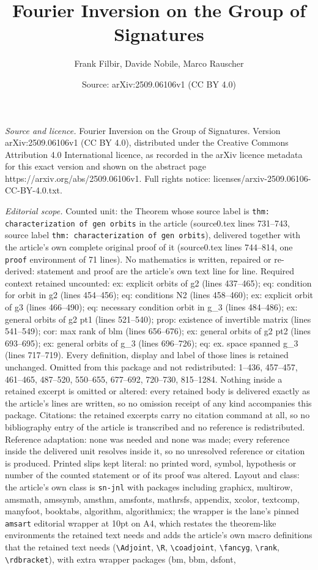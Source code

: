 \documentclass[10pt,a4paper]{amsart}
\title[Fourier Inversion on the Group of Signatures]{Fourier Inversion on the Group of Signatures}
\author{Frank Filbir, Davide Nobile, Marco Rauscher}
\date{Source: arXiv:2509.06106v1 (CC BY 4.0)}
\begin{document}
\maketitle

\noindent\emph{Source and licence.} Fourier Inversion on the Group of Signatures. Version arXiv:2509.06106v1 (CC BY 4.0), distributed under the Creative Commons Attribution 4.0 International licence, as recorded in the arXiv licence metadata for this exact version and shown on the abstract page https://arxiv.org/abs/2509.06106v1. Full rights notice: licenses/arxiv-2509.06106-CC-BY-4.0.txt.\par\smallskip

\noindent\textit{Editorial scope.} Counted unit: the Theorem whose source label is \texttt{thm: characterization of gen orbits} in the article (source0.tex lines 731--743, source label \texttt{thm: characterization of gen orbits}), delivered together with the article's own complete original proof of it (source0.tex lines 744--814, one \texttt{proof} environment of 71 lines). No mathematics is written, repaired or re-derived: statement and proof are the article's own text line for line. Required context retained uncounted: ex: explicit orbits of g2 (lines 437--465); eq: condition for orbit in g2 (lines 454--456); eq: conditions N2 (lines 458--460); ex: explicit orbit of g3 (lines 466--490); eq: necessary condition orbit in g\_3 (lines 484--486); ex: general orbits of g2 pt1 (lines 521--540); prop: existence of invertible matrix (lines 541--549); cor: max rank of blm (lines 656--676); ex: general orbits of g2 pt2 (lines 693--695); ex: general orbits of g\_3 (lines 696--726); eq: ex. space spanned g\_3 (lines 717--719). Every definition, display and label of those lines is retained unchanged. Omitted from this package and not redistributed: 1--436, 457--457, 461--465, 487--520, 550--655, 677--692, 720--730, 815--1284. Nothing inside a retained excerpt is omitted or altered: every retained body is delivered exactly as the article's lines are written, so no omission receipt of any kind accompanies this package. Citations: the retained excerpts carry no citation command at all, so no bibliography entry of the article is transcribed and no reference is redistributed. Reference adaptation: none was needed and none was made; every reference inside the delivered unit resolves inside it, so no unresolved reference or citation is produced. Printed slips kept literal: no printed word, symbol, hypothesis or number of the counted statement or of its proof was altered. Layout and class: the article's own class is \texttt{sn-jnl} with packages including graphicx, multirow, amsmath, amssymb, amsthm, amsfonts, mathrsfs, appendix, xcolor, textcomp, manyfoot, booktabs, algorithm, algorithmicx; the wrapper is the lane's pinned \texttt{amsart} editorial wrapper at 10pt on A4, which restates the theorem-like environments the retained text needs and adds the article's own macro definitions that the retained text needs (\texttt{\textbackslash Adjoint}, \texttt{\textbackslash R}, \texttt{\textbackslash coadjoint}, \texttt{\textbackslash fancyg}, \texttt{\textbackslash rank}, \texttt{\textbackslash rdbracket}), with extra wrapper packages (bm, bbm, dsfont, 
\end{document}
